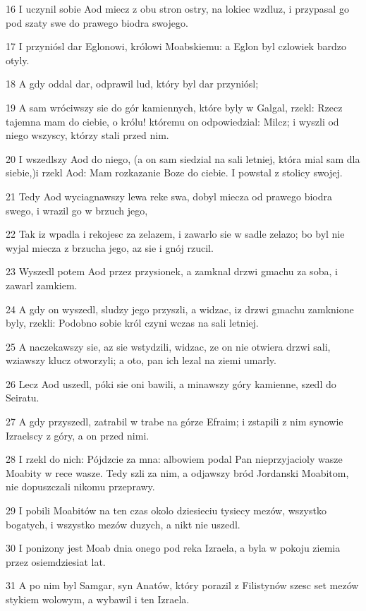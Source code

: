 \par 16 I uczynil sobie Aod miecz z obu stron ostry, na lokiec wzdluz, i przypasal go pod szaty swe do prawego biodra swojego.
\par 17 I przyniósl dar Eglonowi, królowi Moabskiemu: a Eglon byl czlowiek bardzo otyly.
\par 18 A gdy oddal dar, odprawil lud, który byl dar przyniósl;
\par 19 A sam wróciwszy sie do gór kamiennych, które byly w Galgal, rzekl: Rzecz tajemna mam do ciebie, o królu! któremu on odpowiedzial: Milcz; i wyszli od niego wszyscy, którzy stali przed nim.
\par 20 I wszedlszy Aod do niego, (a on sam siedzial na sali letniej, która mial sam dla siebie,)i rzekl Aod: Mam rozkazanie Boze do ciebie. I powstal z stolicy swojej.
\par 21 Tedy Aod wyciagnawszy lewa reke swa, dobyl miecza od prawego biodra swego, i wrazil go w brzuch jego,
\par 22 Tak iz wpadla i rekojesc za zelazem, i zawarlo sie w sadle zelazo; bo byl nie wyjal miecza z brzucha jego, az sie i gnój rzucil.
\par 23 Wyszedl potem Aod przez przysionek, a zamknal drzwi gmachu za soba, i zawarl zamkiem.
\par 24 A gdy on wyszedl, sludzy jego przyszli, a widzac, iz drzwi gmachu zamknione byly, rzekli: Podobno sobie król czyni wczas na sali letniej.
\par 25 A naczekawszy sie, az sie wstydzili, widzac, ze on nie otwiera drzwi sali, wziawszy klucz otworzyli; a oto, pan ich lezal na ziemi umarly.
\par 26 Lecz Aod uszedl, póki sie oni bawili, a minawszy góry kamienne, szedl do Seiratu.
\par 27 A gdy przyszedl, zatrabil w trabe na górze Efraim; i zstapili z nim synowie Izraelscy z góry, a on przed nimi.
\par 28 I rzekl do nich: Pójdzcie za mna: albowiem podal Pan nieprzyjacioly wasze Moabity w rece wasze. Tedy szli za nim, a odjawszy bród Jordanski Moabitom, nie dopuszczali nikomu przeprawy.
\par 29 I pobili Moabitów na ten czas okolo dziesieciu tysiecy mezów, wszystko bogatych, i wszystko mezów duzych, a nikt nie uszedl.
\par 30 I ponizony jest Moab dnia onego pod reka Izraela, a byla w pokoju ziemia przez osiemdziesiat lat.
\par 31 A po nim byl Samgar, syn Anatów, który porazil z Filistynów szesc set mezów stykiem wolowym, a wybawil i ten Izraela.

